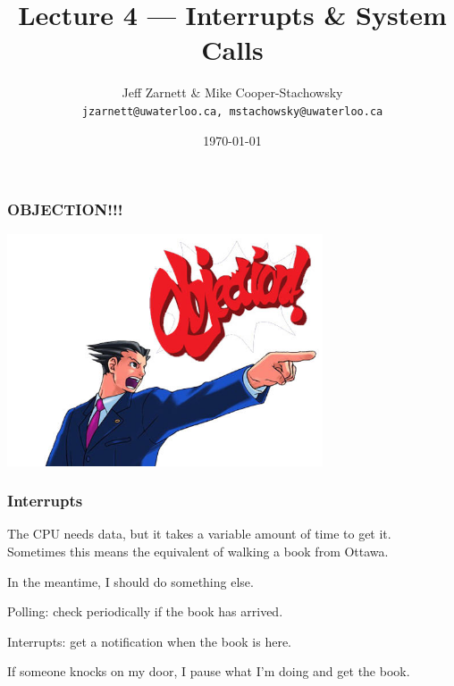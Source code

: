 

\title{Lecture 4 --- Interrupts \& System Calls }

\author{Jeff Zarnett \& Mike Cooper-Stachowsky \\ \small \texttt{jzarnett@uwaterloo.ca, mstachowsky@uwaterloo.ca}}
\date{\today}




\begin{frame}
	\titlepage

\end{frame}


\begin{frame}
	\frametitle{OBJECTION!!!}

	\begin{center}
		\includegraphics[width=0.7\textwidth]{images/phoenix-wright-objection.jpg}
	\end{center}


\end{frame}


\begin{frame}
	\frametitle{Interrupts}
	The CPU needs data, but it takes a variable amount of time to get it.\\
	\quad Sometimes this means the equivalent of walking a book from Ottawa.

	In the meantime, I should do something else.

	Polling: check periodically if the book has arrived.

	Interrupts: get a notification when the book is here.

	If someone knocks on my door, I pause what I'm doing and get the book.


\end{frame}

